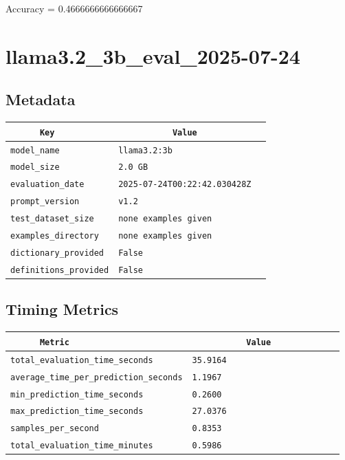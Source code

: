 \documentclass{article}
\begin{document}
\begin{center}
Accuracy = 0.4666666666666667
\end{center}

\section{llama3.2\_3b\_eval\_2025-07-24}
\subsection{Metadata}

\begin{center}
\begin{tabular}{l | l} \hline
    \verb|      Key      | & \verb|           Value           | \\ \hline
    \hline
    \verb|model_name    | & \verb|llama3.2:3b                  | \\ \hline
    \verb|model_size    | & \verb|2.0 GB                       | \\ \hline
    \verb|evaluation_date| & \verb|2025-07-24T00:22:42.030428Z  | \\ \hline
    \verb|prompt_version| & \verb|v1.2                         | \\ \hline
    \verb|test_dataset_size| & \verb|none examples given          | \\ \hline
    \verb|examples_directory| & \verb|none examples given          | \\ \hline
    \verb|dictionary_provided| & \verb|False                        | \\ \hline
    \verb|definitions_provided| & \verb|False                        | \\ \hline
\end{tabular}
\end{center}

\subsection{Timing Metrics}

\begin{center}
\begin{tabular}{l | l} \hline
    \verb|      Metric     | & \verb|           Value           | \\ \hline
    \hline
    \verb|total_evaluation_time_seconds| & \verb|35.9164                      | \\ \hline
    \verb|average_time_per_prediction_seconds| & \verb|1.1967                       | \\ \hline
    \verb|min_prediction_time_seconds| & \verb|0.2600                       | \\ \hline
    \verb|max_prediction_time_seconds| & \verb|27.0376                      | \\ \hline
    \verb|samples_per_second| & \verb|0.8353                       | \\ \hline
    \verb|total_evaluation_time_minutes| & \verb|0.5986                       | \\ \hline
\end{tabular}
\end{center}
\end{document}

